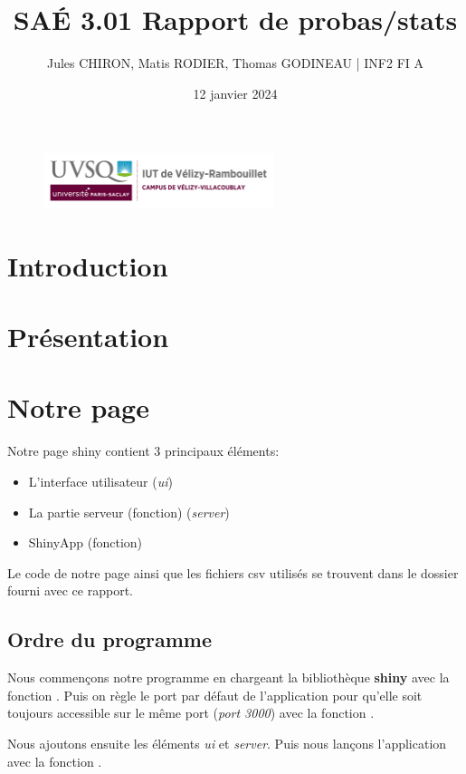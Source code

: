 \documentclass[12pt, a4paper]{article}
\title{SAÉ 3.01 Rapport de probas/stats}
\author{Jules CHIRON, Matis RODIER, Thomas GODINEAU | INF2 FI A}
\date{12 janvier 2024}
\begin{document}
\maketitle

\begin{figure}[h]
    \includegraphics[width=0.6\textwidth]{../annexes/logo_uvsq}
\end{figure}

\tableofcontents{}

\section*{Introduction}

\section{Présentation}

\section{Notre page}

Notre page shiny contient 3 principaux éléments:
\begin{itemize}
    \item L'interface utilisateur (\textit{ui})
    \item La partie serveur (fonction) (\textit{server})
    \item ShinyApp (fonction)
\end{itemize}
Le code de notre page ainsi que les fichiers csv utilisés se trouvent dans le dossier fourni avec ce rapport.

\subsection*{Ordre du programme}

Nous commençons notre programme en chargeant la bibliothèque \textbf{shiny} avec la fonction .
Puis on règle le port par défaut de l'application pour qu'elle soit toujours accessible sur le même port (\textit{port 3000})
avec la fonction .
\bigskip

Nous ajoutons ensuite les éléments \textit{ui} et \textit{server}.
Puis nous lançons l'application avec la fonction .
\end{document}
